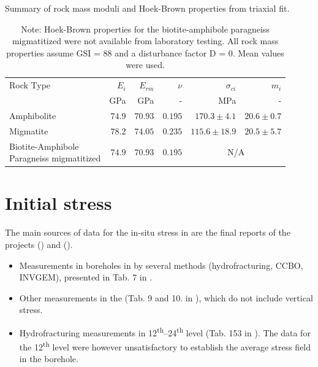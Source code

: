 \begin{table}[!htbp]
\centering
\caption{Summary of rock mass moduli and Hoek-Brown properties from triaxial fit.}
\label{tab:hoek_brown_summary_improved}
\scriptsize
\begin{tabular}{lrrrrr}
\toprule
Rock Type & $E_i$ & $E_{rm}$ & $\nu$ & $\sigma_{ci}$ & $m_i$ \\
& \unit\GPa & \unit\GPa & - & \unit\MPa & -\\
\midrule
Amphibolite & $74.9$ & $70.93$ & $0.195$ & $170.3 \pm 4.1$ & $20.6 \pm 0.7$ \\
Migmatite   & $78.2$ & $74.05$ & $0.235$ & $115.6 \pm 18.9$ & $20.5 \pm 5.7$ \\
\makecell[l]{Biotite-Amphibole \\ Paragneiss migmatitized} & $74.9$ & $70.93$ & $0.195$ & \multicolumn{2}{c}{N/A} \\
\bottomrule
\end{tabular}
\caption*{Note: Hoek-Brown properties for the biotite-amphibole paragneiss migmatitized were not available from laboratory testing. All rock mass properties assume GSI = 88 and a disturbance factor D = 0. Mean values were used.}
\end{table}



\section{Initial stress}\label{sec:review_stress}
The main sources of data for the in-situ stress in \URFBI are the final reports of the projects  (\cite{tz_napjatost}) and  (\cite{tz_hh}).

\begin{itemize}
    \item Measurements in boreholes in \URFBI by several methods (hydrofracturing, CCBO, INVGEM), presented in Tab. 7 in \cite{tz_napjatost}.

    \item Other measurements in the \Rozna (Tab. 9 and 10. in \cite{tz_napjatost}), which do not include vertical stress.

    \item Hydrofracturing measurements in 12\textsuperscript{th}--24\textsuperscript{th} level (Tab. 153 in \cite{tz_hh}). The data for the 12\textsuperscript{th} level were however unsatisfactory to establish the average stress field in the borehole.
\end{itemize}

